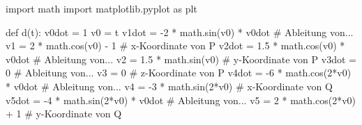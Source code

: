 \documentclass[
  a4paper,
  DIV=11]{scrreprt}
\newenvironment{Shaded}{\begin{snugshade}}{\end{snugshade}}
\newcommand{\CommentTok}[1]{\textcolor[rgb]{0.37,0.37,0.37}{#1}}
\newcommand{\DecValTok}[1]{\textcolor[rgb]{0.68,0.00,0.00}{#1}}
\newcommand{\FloatTok}[1]{\textcolor[rgb]{0.68,0.00,0.00}{#1}}
\newcommand{\ImportTok}[1]{\textcolor[rgb]{0.00,0.46,0.62}{#1}}
\newcommand{\KeywordTok}[1]{\textcolor[rgb]{0.00,0.23,0.31}{#1}}
\newcommand{\NormalTok}[1]{\textcolor[rgb]{0.00,0.23,0.31}{#1}}
\newcommand{\OperatorTok}[1]{\textcolor[rgb]{0.37,0.37,0.37}{#1}}
\theoremstyle{definition}
\theoremstyle{definition}
\theoremstyle{remark}
\begin{document}
\begin{tcolorbox}[enhanced jigsaw, titlerule=0mm, title=\textcolor{quarto-callout-tip-color}{\faLightbulb}\hspace{0.5em}{Lösung}, breakable, coltitle=black, leftrule=.75mm, bottomrule=.15mm, colback=white, rightrule=.15mm, opacitybacktitle=0.6, bottomtitle=1mm, toptitle=1mm, left=2mm, toprule=.15mm, colbacktitle=quarto-callout-tip-color!10!white, colframe=quarto-callout-tip-color-frame, arc=.35mm, opacityback=0]

\begin{Shaded}
\begin{Highlighting}[]
\ImportTok{import}\NormalTok{ math}
\ImportTok{import}\NormalTok{ matplotlib.pyplot }\ImportTok{as}\NormalTok{ plt}

\KeywordTok{def}\NormalTok{ d(t):}
\NormalTok{    v0dot }\OperatorTok{=} \DecValTok{1}                    
\NormalTok{    v0 }\OperatorTok{=}\NormalTok{ t}
\NormalTok{    v1dot }\OperatorTok{=} \OperatorTok{{-}}\DecValTok{2} \OperatorTok{*}\NormalTok{ math.sin(v0) }\OperatorTok{*}\NormalTok{ v0dot   }\CommentTok{\# Ableitung von...}
\NormalTok{    v1 }\OperatorTok{=} \DecValTok{2} \OperatorTok{*}\NormalTok{ math.cos(v0) }\OperatorTok{{-}} \DecValTok{1}    \CommentTok{\# x{-}Koordinate von P}
\NormalTok{    v2dot }\OperatorTok{=} \FloatTok{1.5} \OperatorTok{*}\NormalTok{ math.cos(v0) }\OperatorTok{*}\NormalTok{ v0dot  }\CommentTok{\# Ableitung von...}
\NormalTok{    v2 }\OperatorTok{=} \FloatTok{1.5} \OperatorTok{*}\NormalTok{ math.sin(v0)      }\CommentTok{\# y{-}Koordinate von P}
\NormalTok{    v3dot }\OperatorTok{=} \DecValTok{0}                    \CommentTok{\# Ableitung von...}
\NormalTok{    v3 }\OperatorTok{=} \DecValTok{0}                       \CommentTok{\# z{-}Koordinate von P}
\NormalTok{    v4dot }\OperatorTok{=} \OperatorTok{{-}}\DecValTok{6} \OperatorTok{*}\NormalTok{ math.cos(}\DecValTok{2}\OperatorTok{*}\NormalTok{v0) }\OperatorTok{*}\NormalTok{ v0dot }\CommentTok{\# Ableitung von...}
\NormalTok{    v4 }\OperatorTok{=} \OperatorTok{{-}}\DecValTok{3} \OperatorTok{*}\NormalTok{ math.sin(}\DecValTok{2}\OperatorTok{*}\NormalTok{v0)     }\CommentTok{\# x{-}Koordinate von Q}
\NormalTok{    v5dot }\OperatorTok{=} \OperatorTok{{-}}\DecValTok{4} \OperatorTok{*}\NormalTok{ math.sin(}\DecValTok{2}\OperatorTok{*}\NormalTok{v0) }\OperatorTok{*}\NormalTok{ v0dot }\CommentTok{\# Ableitung von...}
\NormalTok{    v5 }\OperatorTok{=} \DecValTok{2} \OperatorTok{*}\NormalTok{ math.cos(}\DecValTok{2}\OperatorTok{*}\NormalTok{v0) }\OperatorTok{+} \DecValTok{1}  \CommentTok{\# y{-}Koordinate von Q}

\end{Highlighting}
\end{Shaded}
\end{tcolorbox}
\end{document}
